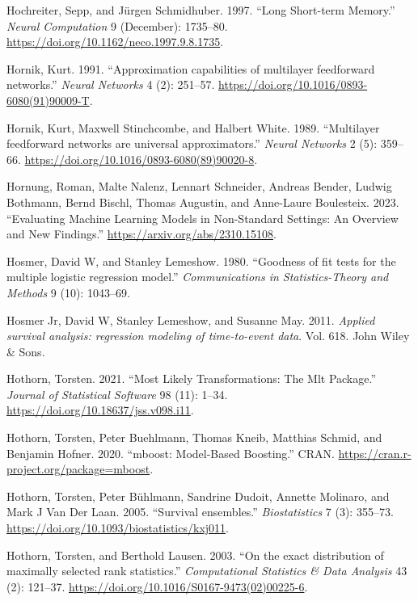 \documentclass[
  letterpaper,
  krantz2]{style/krantz}
\newlength{\cslhangindent}
\newenvironment{CSLReferences}[2] %
 {\begin{list}{}{%
  \setlength{\itemindent}{0pt}
  \setlength{\leftmargin}{0pt}
  \setlength{\parsep}{0pt}
  \ifodd #1
   \setlength{\leftmargin}{\cslhangindent}
   \setlength{\itemindent}{-1\cslhangindent}
  \fi
  \setlength{\itemsep}{#2\baselineskip}}}
 {\end{list}}
\begin{document}
\begin{CSLReferences}{1}{0}
Hochreiter, Sepp, and Jürgen Schmidhuber. 1997. {``{Long Short-term
Memory}.''} \emph{Neural Computation} 9 (December): 1735--80.
\url{https://doi.org/10.1162/neco.1997.9.8.1735}.

Hornik, Kurt. 1991. {``{Approximation capabilities of multilayer
feedforward networks}.''} \emph{Neural Networks} 4 (2): 251--57.
\url{https://doi.org/10.1016/0893-6080(91)90009-T}.

Hornik, Kurt, Maxwell Stinchcombe, and Halbert White. 1989.
{``{Multilayer feedforward networks are universal approximators}.''}
\emph{Neural Networks} 2 (5): 359--66.
\url{https://doi.org/10.1016/0893-6080(89)90020-8}.

Hornung, Roman, Malte Nalenz, Lennart Schneider, Andreas Bender, Ludwig
Bothmann, Bernd Bischl, Thomas Augustin, and Anne-Laure Boulesteix.
2023. {``Evaluating Machine Learning Models in Non-Standard Settings: An
Overview and New Findings.''} \url{https://arxiv.org/abs/2310.15108}.

Hosmer, David W, and Stanley Lemeshow. 1980. {``{Goodness of fit tests
for the multiple logistic regression model}.''} \emph{Communications in
Statistics-Theory and Methods} 9 (10): 1043--69.

Hosmer Jr, David W, Stanley Lemeshow, and Susanne May. 2011.
\emph{{Applied survival analysis: regression modeling of time-to-event
data}}. Vol. 618. John Wiley \& Sons.

Hothorn, Torsten. 2021. {``Most Likely Transformations: The Mlt
Package.''} \emph{Journal of Statistical Software} 98 (11): 1--34.
\url{https://doi.org/10.18637/jss.v098.i11}.

Hothorn, Torsten, Peter Buehlmann, Thomas Kneib, Matthias Schmid, and
Benjamin Hofner. 2020. {``{mboost: Model-Based Boosting}.''} CRAN.
\url{https://cran.r-project.org/package=mboost}.

Hothorn, Torsten, Peter Bühlmann, Sandrine Dudoit, Annette Molinaro, and
Mark J Van Der Laan. 2005. {``{Survival ensembles}.''}
\emph{Biostatistics} 7 (3): 355--73.
\url{https://doi.org/10.1093/biostatistics/kxj011}.

Hothorn, Torsten, and Berthold Lausen. 2003. {``{On the exact
distribution of maximally selected rank statistics}.''}
\emph{Computational Statistics \& Data Analysis} 43 (2): 121--37.
\url{https://doi.org/10.1016/S0167-9473(02)00225-6}.


\end{CSLReferences}
\end{document}
